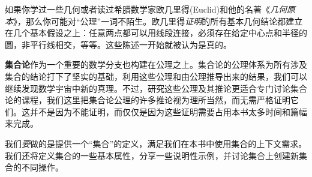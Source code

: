如果你学过一些几何或者读过希腊数学家欧几里得(Euclid)和他的名著《\textit{几何原本}》，那么你可能对``公理''一词不陌生。欧几里得\textit{证明}的所有基本几何结论都建立在几个基本假设之上：任意两点都可以用线段连接，必须存在给定中心点和半径的圆，非平行线相交，等等。这些陈述一开始就被认为是真的。

\textbf{集合论}作为一个重要的数学分支也构建在公理之上。集合论的公理体系为所有涉及集合的结论打下了坚实的基础，利用这些公理和由公理推导出来的结果，我们可以继续发现数学宇宙中新的真理。不过，研究这些公理及其推论更适合专门讨论集合论的课程，我们这里把集合论公理的许多推论视为理所当然，而无需严格证明它们。这并不是因为不能证明，而仅仅是因为这些证明需要占用本书太多时间和篇幅来完成。

我们\textit{要}做的是提供一个``集合''的定义，满足我们在本书中使用集合的上下文需求。我们还将定义集合的一些基本属性，分享一些说明性示例，并讨论集合上创建新集合的不同操作。

